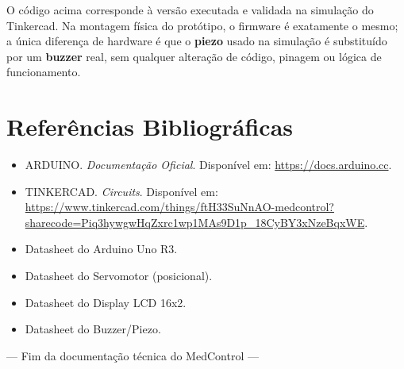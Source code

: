 \documentclass[11pt,a4paper]{article}
\begin{document}
\begin{infobox}[Nota]
O código acima corresponde à versão executada e validada na simulação do Tinkercad. Na montagem física do protótipo, o firmware é exatamente o mesmo; a única diferença de hardware é que o \textbf{piezo} usado na simulação é substituído por um \textbf{buzzer} real, sem qualquer alteração de código, pinagem ou lógica de funcionamento.
\end{infobox}

\newpage
\section{Referências Bibliográficas}

\begin{itemize}[leftmargin=1.4em, itemsep=4pt]
  \item ARDUINO. \textit{Documentação Oficial}. Disponível em: \url{https://docs.arduino.cc}.
  \item TINKERCAD. \textit{Circuits}. Disponível em: \url{https://www.tinkercad.com/things/ftH33SuNnAO-medcontrol?sharecode=Piq3hywgwHqZxrc1wp1MAs9D1p_18CyBY3xNzeBqxWE}.
  \item Datasheet do Arduino Uno R3.
  \item Datasheet do Servomotor (posicional).
  \item Datasheet do Display LCD 16x2.
  \item Datasheet do Buzzer/Piezo.
\end{itemize}

\vspace{2cm}
\begin{center}
\color{mcGray}\small
--- Fim da documentação técnica do MedControl ---
\end{center}
\end{document}
